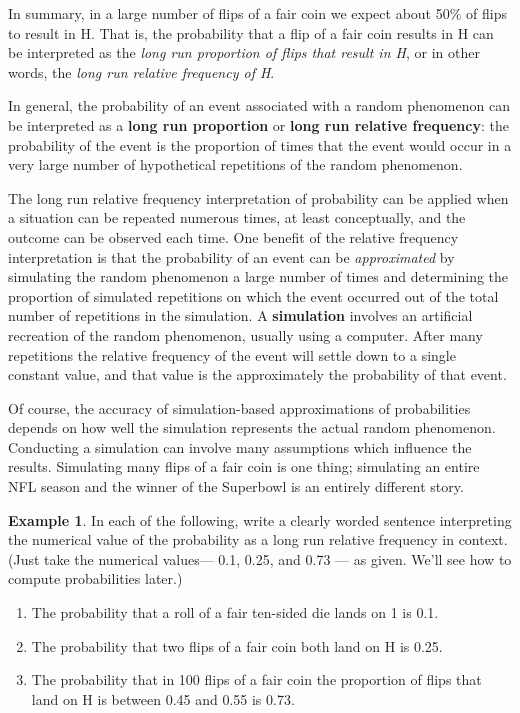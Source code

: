 \documentclass[
]{book}
\providecommand{\tightlist}{%
  \setlength{\itemsep}{0pt}\setlength{\parskip}{0pt}}
\theoremstyle{definition}
\theoremstyle{definition}
\newtheorem{example}{Example}[chapter]
\theoremstyle{definition}
\theoremstyle{remark}
\begin{document}
In summary, in a large number of flips of a fair coin we expect about 50\% of flips to result in H. That is, the probability that a flip of a fair coin results in H can be interpreted as the \emph{long run proportion of flips that result in H}, or in other words, the \emph{long run relative frequency of H}.

In general, the probability of an event associated with a random phenomenon can be interpreted as a \textbf{long run proportion} or \textbf{long run relative frequency}: the probability of the event is the proportion of times that the event would occur in a very large number of hypothetical repetitions of the random phenomenon.

The long run relative frequency interpretation of probability can be applied when a situation can be repeated numerous times, at least conceptually, and the outcome can be observed each time. One benefit of the relative frequency interpretation is that the probability of an event can be \emph{approximated} by simulating the random phenomenon a large number of times and determining the proportion of simulated repetitions on which the event occurred out of the total number of repetitions in the simulation. A \textbf{simulation} involves an artificial recreation of the random phenomenon, usually using a computer. After many repetitions the relative frequency of the event will settle down to a single constant value, and that value is the approximately the probability of that event.

Of course, the accuracy of simulation-based approximations of probabilities depends on how well the simulation represents the actual random phenomenon. Conducting a simulation can involve many assumptions which influence the results. Simulating many flips of a fair coin is one thing; simulating an entire NFL season and the winner of the Superbowl is an entirely different story.

\begin{example}
\protect\hypertarget{exm:interpret-rel-freq}{}{\label{exm:interpret-rel-freq} }
In each of the following, write a clearly worded sentence interpreting the numerical value of the probability as a long run relative frequency in context. (Just take the numerical values--- 0.1, 0.25, and 0.73 --- as given. We'll see how to compute probabilities later.)

\begin{enumerate}
\def\labelenumi{\arabic{enumi}.}
\tightlist
\item
  The probability that a roll of a fair ten-sided die lands on 1 is 0.1.
\item
  The probability that two flips of a fair coin both land on H is 0.25.
\item
  The probability that in 100 flips of a fair coin the proportion of flips that land on H is between 0.45 and 0.55 is 0.73.
\end{enumerate}
\end{example}
\end{document}
